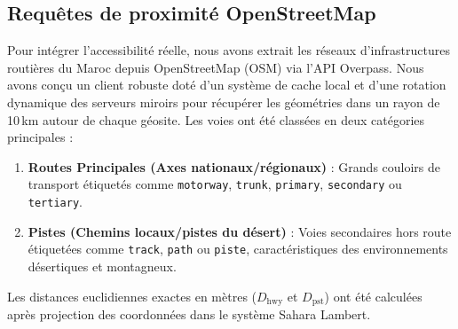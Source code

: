 \documentclass[11pt,twocolumn,a4paper]{article}
\begin{document}
\subsection{Requêtes de proximité OpenStreetMap}
Pour intégrer l'accessibilité réelle, nous avons extrait les réseaux d'infrastructures routières du Maroc depuis OpenStreetMap (OSM) via l'API Overpass. Nous avons conçu un client robuste doté d'un système de cache local et d'une rotation dynamique des serveurs miroirs pour récupérer les géométries dans un rayon de 10\,km autour de chaque géosite. Les voies ont été classées en deux catégories principales :
\begin{enumerate}
    \item \textbf{Routes Principales (Axes nationaux/régionaux)} : Grands couloirs de transport étiquetés comme \texttt{motorway}, \texttt{trunk}, \texttt{primary}, \texttt{secondary} ou \texttt{tertiary}.
    \item \textbf{Pistes (Chemins locaux/pistes du désert)} : Voies secondaires hors route étiquetées comme \texttt{track}, \texttt{path} ou \texttt{piste}, caractéristiques des environnements désertiques et montagneux.
\end{enumerate}
Les distances euclidiennes exactes en mètres ($D_{\text{hwy}}$ et $D_{\text{pst}}$) ont été calculées après projection des coordonnées dans le système Sahara Lambert.
\end{document}
